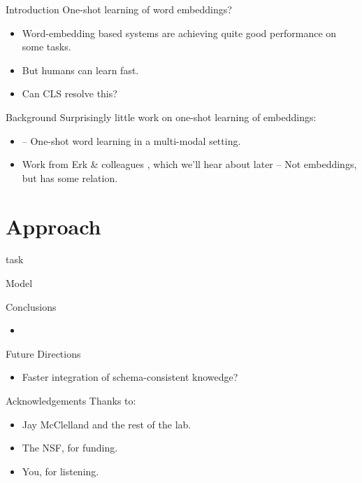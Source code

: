 \documentclass{beamer}
\begin{document}
\begin{frame}{Introduction}
One-shot learning of word embeddings? 
\begin{itemize}
    \item<1-> Word-embedding based systems are achieving quite good performance on some tasks. 
    \item<2-> But humans can learn fast.
    \item<3-> Can CLS resolve this?
\end{itemize}
\end{frame}


\begin{frame}{Background}
Surprisingly little work on one-shot learning of embeddings:
\begin{itemize}
    \item<1-> \cite{Lazaridou2017} -- One-shot word learning in a multi-modal setting. 
    \item<2-> Work from Erk \& colleagues \cite{Wang2017}, which we'll hear about later -- Not embeddings, but has some relation.
\end{itemize}
\end{frame}

\section{Approach}
\begin{frame}{task}

\end{frame}

\begin{frame}{Model}

\end{frame}

\begin{frame}{Conclusions}
\begin{itemize}
    \item<1-> 
\end{itemize}
\end{frame}

\begin{frame}{Future Directions}
\begin{itemize}
    \item<4-> Faster integration of schema-consistent knowedge?
\end{itemize}
\end{frame}

\begin{frame}{Acknowledgements}
Thanks to:
\begin{itemize}
    \item Jay McClelland and the rest of the lab.
    \item The NSF, for funding.
    \item You, for listening. 
\end{itemize}
\end{frame}

\begin{frame}[allowframebreaks]


\end{frame}
\end{document}

